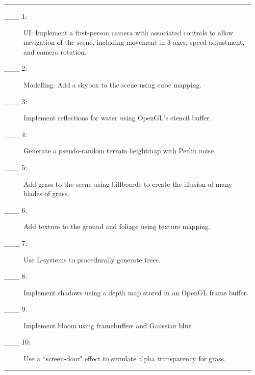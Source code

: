 \documentclass{article}
\begin{document}
\hrule
\begin{description}
        \item[\_\_\_ 1:]
          UI: Implement a first-person camera with associated controls to allow navigation of the scene, including movement in 3 axes, speed adjustment, and camera rotation.

        \item[\_\_\_ 2:]
		  Modelling: Add a skybox to the scene using cube mapping.

        \item[\_\_\_ 3:]
		  Implement reflections for water using OpenGL's stencil buffer.
			
        \item[\_\_\_ 4:]
		  Generate a pseudo-random terrain heightmap with Perlin noise.

        \item[\_\_\_ 5:]
		  Add grass to the scene using billboards to create the illusion of many blades of grass.

        \item[\_\_\_ 6:]
	      Add texture to the ground and foliage using texture mapping.

        \item[\_\_\_ 7:]
		  Use L-systems to procedurally generate trees.

        \item[\_\_\_ 8:]
		  Implement shadows using a depth map stored in an OpenGL frame buffer.

        \item[\_\_\_ 9:]
		  Implement bloom using framebuffers and Gaussian blur.

        \item[\_\_\_ 10:]
		  Use a ``screen-door" effect to simulate alpha transparency for grass.

\end{description}

\hrule
\end{document}
